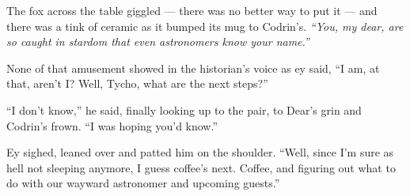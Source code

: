 The fox across the table giggled — there was no better way to put it — and there was a tink of ceramic as it bumped its mug to Codrin's. \emph{``You, my dear, are so caught in stardom that even astronomers know your name.''}

None of that amusement showed in the historian's voice as ey said, ``I am, at that, aren't I? Well, Tycho, what are the next steps?''

``I don't know,'' he said, finally looking up to the pair, to Dear's grin and Codrin's frown. ``I was hoping you'd know.''

Ey sighed, leaned over and patted him on the shoulder. ``Well, since I'm sure as hell not sleeping anymore, I guess coffee's next. Coffee, and figuring out what to do with our wayward astronomer and upcoming guests.''
